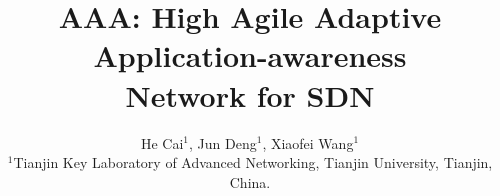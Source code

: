 \documentclass[conference,compsoc]{IEEEtran}
\begin{document}
%
\title{AAA: High Agile Adaptive Application-awareness \\ Network for SDN}


\author{He Cai$^{1}$, Jun Deng$^{1}$, Xiaofei Wang$^{1}$
\\
${^1}$Tianjin Key Laboratory of Advanced Networking, %
Tianjin University, Tianjin, China.
}



% 
\end{document}
